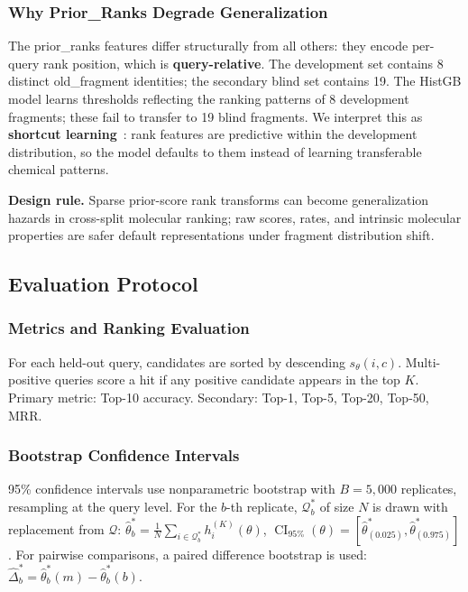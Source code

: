 \documentclass[12pt,letterpaper]{article}
\begin{document}
\subsubsection{Why Prior\_Ranks Degrade Generalization}

The prior\_ranks features differ structurally from all others: they encode per-query rank position, which is \textbf{query-relative}. The development set contains 8 distinct old\_fragment identities; the secondary blind set contains 19. The HistGB model learns thresholds reflecting the ranking patterns of 8 development fragments; these fail to transfer to 19 blind fragments. We interpret this as \textbf{shortcut learning}~\cite{geirhos2020shortcut}: rank features are predictive within the development distribution, so the model defaults to them instead of learning transferable chemical patterns.

\textbf{Design rule.} Sparse prior-score rank transforms can become generalization hazards in cross-split molecular ranking; raw scores, rates, and intrinsic molecular properties are safer default representations under fragment distribution shift.

\subsection{Evaluation Protocol}

\subsubsection{Metrics and Ranking Evaluation}

For each held-out query, candidates are sorted by descending $s_\theta(i,c)$. Multi-positive queries score a hit if any positive candidate appears in the top $K$. Primary metric: Top-10 accuracy. Secondary: Top-1, Top-5, Top-20, Top-50, MRR.

\subsubsection{Bootstrap Confidence Intervals}

95\% confidence intervals use nonparametric bootstrap with $B=5{,}000$ replicates, resampling at the query level. For the $b$-th replicate, $\mathcal{Q}^*_b$ of size $N$ is drawn with replacement from $\mathcal{Q}$: $\hat{\theta}^*_b = \frac{1}{N}\sum_{i\in\mathcal{Q}^*_b} h_i^{(K)}(\theta)$, $\operatorname{CI}_{95\%}(\theta) = [\hat{\theta}^*_{(0.025)}, \hat{\theta}^*_{(0.975)}]$. For pairwise comparisons, a paired difference bootstrap is used: $\hat{\Delta}^*_b = \hat{\theta}^*_b(m) - \hat{\theta}^*_b(b)$.
\end{document}
